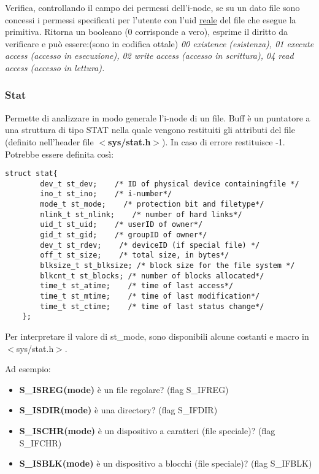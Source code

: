\documentclass{article}
\begin{document}
\noindent Verifica, controllando il campo dei permessi dell'i-node,
 se su un dato file sono concessi i permessi specificati per l'utente con
l'uid \underline{reale} del file che esegue la primitiva.
Ritorna un booleano (0 corrisponde a vero), esprime il diritto da verificare e può essere:(sono in codifica ottale) 
\textit{00 existence (esistenza), 01 execute access (accesso in esecuzione), 02 write access (accesso in scrittura),
 04 read access (accesso in lettura).}

 \subsubsection{Stat}

 \noindent {} 
 \medskip
 
 \noindent Permette di analizzare in modo generale l'i-node di un file. Buff è un puntatore a una struttura di tipo STAT 
 nella quale vengono restituiti gli attributi del file (definito nell'header file \textbf{$<$sys/stat.h$>$}).
 In caso di errore restituisce -1.
 Potrebbe essere definita così:

 \begin{lstlisting}[style=CStyle]
    struct stat{
        dev_t st_dev;    /* ID of physical device containingfile */ 
        ino_t st_ino;    /* i-number*/
        mode_t st_mode;    /* protection bit and filetype*/
        nlink_t st_nlink;    /* number of hard links*/ 
        uid_t st_uid;    /* userID of owner*/ 
        gid_t st_gid;    /* groupID of owner*/
        dev_t st_rdev;    /* deviceID (if special file) */ 
        off_t st_size;    /* total size, in bytes*/ 
        blksize_t st_blksize; /* block size for the file system */ 
        blkcnt_t st_blocks; /* number of blocks allocated*/ 
        time_t st_atime;    /* time of last access*/
        time_t st_mtime;    /* time of last modification*/
        time_t st_ctime;    /* time of last status change*/
    };
\end{lstlisting}

\noindent Per interpretare il valore di st\_mode, sono disponibili alcune costanti e macro in $<$sys/stat.h$>$.

\noindent Ad esempio:
\begin{itemize}
    \item  \textbf{S\_ISREG(mode)} è un file regolare? (flag S\_IFREG)
    \item \textbf{S\_ISDIR(mode)} è una directory? (flag S\_IFDIR)
    \item \textbf{S\_ISCHR(mode)} è un dispositivo a caratteri (file speciale)? (flag S\_IFCHR)
    \item \textbf{S\_ISBLK(mode)} è un dispositivo a blocchi (file speciale)? (flag S\_IFBLK)
\end{itemize}
\end{document}
